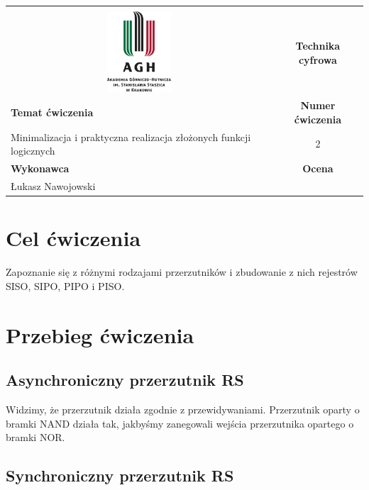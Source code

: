\documentclass[12pt,a4paper]{article}
\begin{document}
\begin{table}[H]
\label{my-label}
\begin{tabular}[width=\textwidth, height=0.5]{|c|c|}
\hline
									           					&                           \\
\includegraphics[height=3cm]{img/logo}             					& \textbf{Technika cyfrowa} \\ \hline
\multicolumn{1}{|l|}{\textbf{Temat ćwiczenia}} 					& \textbf{Numer ćwiczenia}  \\
\multicolumn{1}{|l|}{Minimalizacja i praktyczna realizacja złożonych funkcji logicznych}	& 2                         \\ \hline
\multicolumn{1}{|l|}{\textbf{Wykonawca}}       & \textbf{Ocena}            \\
\multicolumn{1}{|l|}{Łukasz Nawojowski}          &                           \\ \hline
\end{tabular}
\end{table}

\section{Cel ćwiczenia}
Zapoznanie się z różnymi rodzajami przerzutników i zbudowanie z nich rejestrów SISO, SIPO, PIPO i PISO.

\section{Przebieg ćwiczenia}
\subsection{Asynchroniczny przerzutnik RS}

Widzimy, że przerzutnik działa zgodnie z przewidywaniami. Przerzutnik oparty o bramki NAND działa tak, jakbyśmy zanegowali wejścia przerzutnika opartego o bramki NOR.

\subsection{Synchroniczny przerzutnik RS}
\end{document}
